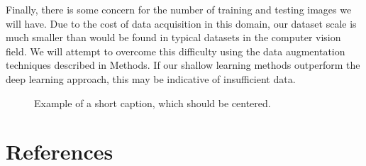 \documentclass[10pt,twocolumn,letterpaper]{article}
\begin{document}
Finally, there is some concern for the number of training and testing images we will have. Due to the cost of data acquisition in this domain, our dataset scale is much smaller than would be found in typical datasets in the computer vision field. We will attempt to overcome this difficulty using the data augmentation techniques described in Methods. If our shallow learning methods outperform the deep learning approach, this may be indicative of insufficient data.


\begin{figure*}
\begin{center}
\fbox{\rule{0pt}{2in} \rule{.9\linewidth}{0pt}}
\end{center}
   \caption{Example of a short caption, which should be centered.}
\label{fig:short}
\end{figure*}

%


\section{References}
\label{sec:References}


{\small


}
\end{document}
